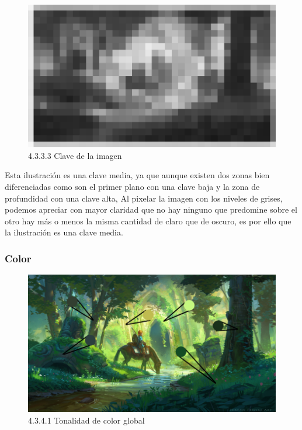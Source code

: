 \documentclass[12pt]{article}
\begin{document}
    \begin{figure}[H]
      \centering
      \includegraphics[scale=0.7]{images/Saúl/Sección 3/EA_img3_3Claroscuro_3Clave.png}
      \caption{\small 4.3.3.3 Clave de la imagen}
    \end{figure}

Esta ilustración es una clave media, ya que aunque existen dos zonas bien diferenciadas como son el primer plano con una clave baja y la zona de profundidad con una clave alta, Al pixelar la imagen con los niveles de grises, podemos apreciar con mayor claridad que no hay ninguno que predomine sobre el otro hay más o menos la misma cantidad de claro que de oscuro, es por ello que la ilustración es una clave media.

        \subsubsection{Color}


    \begin{figure}[H]
      \centering
      \includegraphics[scale=0.7]{images/Saúl/Sección 3/EA_img3_4Color_1TonalidadGenral.png}
      \caption{\small 4.3.4.1 Tonalidad de color global}
    \end{figure}
\end{document}
